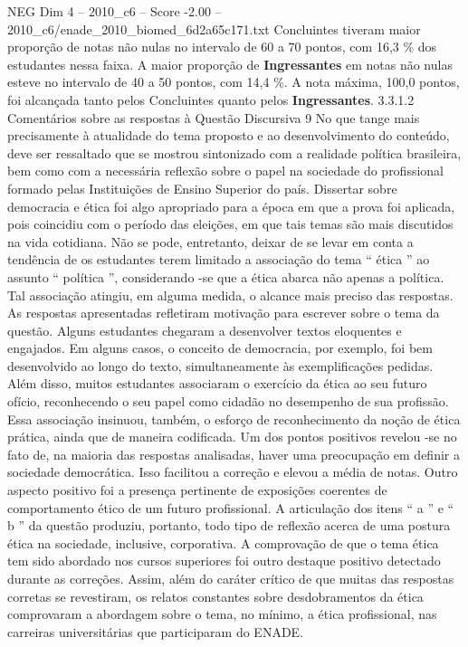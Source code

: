 \begin{textsample}{NEG Dim 4 – 2010\_c6 – Score -2.00 – 2010\_c6/enade\_2010\_biomed\_6d2a65c171.txt}
Concluintes tiveram maior proporção de notas não nulas no intervalo de 60 a 70 pontos, com 16,3 \% dos estudantes nessa faixa.
A maior proporção de \textbf{Ingressantes} em notas não nulas esteve no intervalo de 40 a 50 pontos, com 14,4 \%.
A nota máxima, 100,0 pontos, foi alcançada tanto pelos Concluintes quanto pelos \textbf{Ingressantes}. 3.3.1.2 Comentários sobre as respostas à Questão Discursiva 9 No que tange mais precisamente à atualidade do tema proposto e ao desenvolvimento do conteúdo, deve ser ressaltado que se mostrou sintonizado com a realidade política brasileira, bem como com a necessária reflexão sobre o papel na sociedade do profissional formado pelas Instituições de Ensino Superior do país.
Dissertar sobre democracia e ética foi algo apropriado para a época em que a prova foi aplicada, pois coincidiu com o período das eleições, em que tais temas são mais discutidos na vida cotidiana.
Não se pode, entretanto, deixar de se levar em conta a tendência de os estudantes terem limitado a associação do tema “ ética ” ao assunto “ política ”, considerando -se que a ética abarca não apenas a política.
Tal associação atingiu, em alguma medida, o alcance mais preciso das respostas.
As respostas apresentadas refletiram motivação para escrever sobre o tema da questão.
Alguns estudantes chegaram a desenvolver textos eloquentes e engajados.
Em alguns casos, o conceito de democracia, por exemplo, foi bem desenvolvido ao longo do texto, simultaneamente às exemplificações pedidas.
Além disso, muitos estudantes associaram o exercício da ética ao seu futuro ofício, reconhecendo o seu papel como cidadão no desempenho de sua profissão.
Essa associação insinuou, também, o esforço de reconhecimento da noção de ética prática, ainda que de maneira codificada.
Um dos pontos positivos revelou -se no fato de, na maioria das respostas analisadas, haver uma preocupação em definir a sociedade democrática.
Isso facilitou a correção e elevou a média de notas.
Outro aspecto positivo foi a presença pertinente de exposições coerentes de comportamento ético de um futuro profissional.
A articulação dos itens “ a ” e “ b ” da questão produziu, portanto, todo tipo de reflexão acerca de uma postura ética na sociedade, inclusive, corporativa.
A comprovação de que o tema ética tem sido abordado nos cursos superiores foi outro destaque positivo detectado durante as correções.
Assim, além do caráter crítico de que muitas das respostas corretas se revestiram, os relatos constantes sobre desdobramentos da ética comprovaram a abordagem sobre o tema, no mínimo, a ética profissional, nas carreiras universitárias que participaram do ENADE.

\end{textsample}
